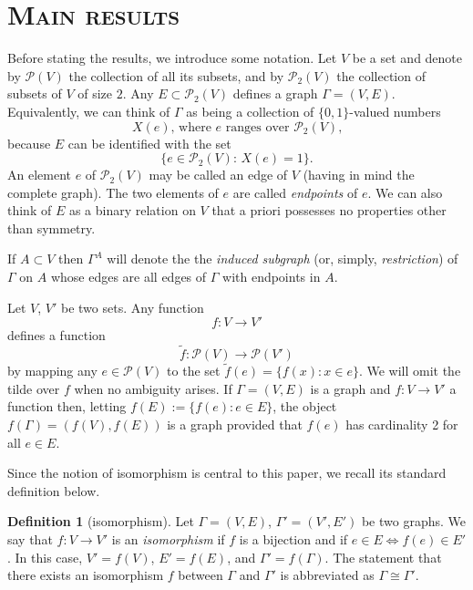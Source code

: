 \documentclass[reqno]{amsart}
\theoremstyle{theorem}
\theoremstyle{definition}
\newtheorem{definition}[theorem]{Definition}
\theoremstyle{remark}
\def\PP{\mathscr{P}}
\newcommand{\1}{{\text{\Large $\mathfrak 1$}}}	%
\numberwithin{equation}{section}
\begin{document}
\section{\bfseries\scshape  Main results}
Before stating the results, we introduce some notation.
Let $V$ be a set and denote by $\PP(V)$ the collection of all its subsets,
and by $\PP_2(V)$ the collection of subsets of $V$ of size $2$.
Any $E \subset \PP_2(V)$ defines a graph $\Gamma=(V, E)$.
Equivalently, we can think of 
$\Gamma$ as being a collection of $\{0,1\}$-valued numbers
\[
\text{$X(e)$, where $e$ ranges over $\PP_2(V)$,}
\]
because $E$ can be identified with the set 
\[
\{e\in \PP_2(V):\, X(e)=1\}.
\]
An element $e$ of $\PP_2(V)$ may be called an edge of $V$
(having in mind the complete graph).
The two elements of $e$ are called {\em endpoints} of $e$.
We can also think of $E$ as a binary relation on $V$ that a priori possesses
no properties other than symmetry.

If $A \subset V$ then $\Gamma^A$ will denote the 
the {\em induced subgraph} (or, simply, {\em restriction})  of $\Gamma$ on $A$
whose edges are all edges of $\Gamma$ with endpoints in $A$.

Let $V$, $V'$ be two sets. %
Any function 
\[
f: V \to V'
\]
defines a function 
\[
\widetilde f: \PP(V) \to \PP(V')
\]
by mapping any $e \in \PP(V)$
to the set $\widetilde f(e) = \{f(x): x \in e\}$.
We will omit the tilde over $f$ when no ambiguity arises.
If $\Gamma=(V, E)$ is a graph and $f: V \to V'$ a function
then, letting $f(E) := \{f(e): e \in E\}$, the
object $f(\Gamma)= (f(V), f(E))$ is a graph provided that $f(e)$ has
cardinality 2 for all $e \in E$.

Since the notion of isomorphism is central to this paper,
we recall its standard definition below.
\begin{definition}[isomorphism]
\label{isodef}
Let $\Gamma = (V, E)$, $\Gamma' = (V',E')$ be two graphs.
We say that $f: V \to V'$ is an {\em isomorphism} if $f$ is a bijection
and if $e \in E \iff f(e) \in E'$.
In this case, $V'=f(V)$, $E'=f(E)$, and $\Gamma'=f(\Gamma)$.
The statement that there exists an isomorphism $f$ between $\Gamma$ and
$\Gamma'$ is abbreviated as $\Gamma \cong \Gamma'$.
\end{definition}
\end{document}
